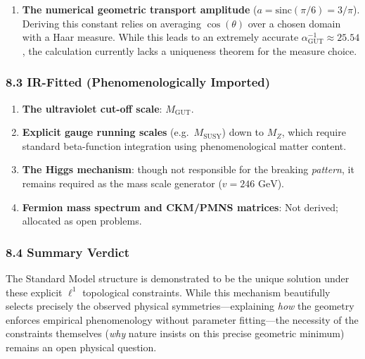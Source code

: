 \documentclass[
]{article}
\providecommand{\tightlist}{%
  \setlength{\itemsep}{0pt}\setlength{\parskip}{0pt}}
\begin{document}
\begin{enumerate}
\def\labelenumi{\arabic{enumi}.}
\tightlist
\item
  \textbf{The numerical geometric transport amplitude}
  (\(a = \mathrm{sinc}(\pi/6) = 3/\pi\)). Deriving this constant relies
  on averaging \(\cos(\theta)\) over a chosen domain with a Haar
  measure. While this leads to an extremely accurate
  \(\alpha_{\mathrm{GUT}}^{-1} \approx 25.54\), the calculation
  currently lacks a uniqueness theorem for the measure choice.
\end{enumerate}

\hypertarget{ir-fitted-phenomenologically-imported}{%
\subsubsection{8.3 IR-Fitted (Phenomenologically
Imported)}\label{ir-fitted-phenomenologically-imported}}

\begin{enumerate}
\def\labelenumi{\arabic{enumi}.}
\tightlist
\item
  \textbf{The ultraviolet cut-off scale}: \(M_{\mathrm{GUT}}\).
\item
  \textbf{Explicit gauge running scales} (e.g.~\(M_{\mathrm{SUSY}}\))
  down to \(M_Z\), which require standard beta-function integration
  using phenomenological matter content.
\item
  \textbf{The Higgs mechanism}: though not responsible for the breaking
  \emph{pattern}, it remains required as the mass scale generator
  (\(v = 246 \text{ GeV}\)).
\item
  \textbf{Fermion mass spectrum and CKM/PMNS matrices}: Not derived;
  allocated as open problems.
\end{enumerate}

\hypertarget{summary-verdict}{%
\subsubsection{8.4 Summary Verdict}\label{summary-verdict}}

The Standard Model structure is demonstrated to be the unique solution
under these explicit \(\ell^1\) topological constraints. While this
mechanism beautifully selects precisely the observed physical
symmetries---explaining \emph{how} the geometry enforces empirical
phenomenology without parameter fitting---the necessity of the
constraints themselves (\emph{why} nature insists on this precise
geometric minimum) remains an open physical question.
\end{document}
